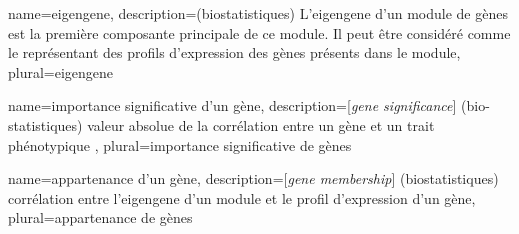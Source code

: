 {
	name={eigengene},
	description={(biostatistiques) L'eigengene d'un module de gènes est la première composante principale de ce module. Il peut être considéré comme le représentant des profils d'expression des gènes présents dans le module}, 
	plural={eigengene}
}

{
	name={importance significative d'un g\`ene},
	description={[\textit{gene significance}] (bio-statistiques) valeur absolue de la corrélation entre un gène et un trait phénotypique }, 
	plural={importance significative de g\`enes}
}

{
	name={appartenance d'un g\`ene},
	description={[\textit{gene membership}] (biostatistiques) corrélation entre l'eigengene d'un module et le profil d'expression d'un gène}, 
	plural={appartenance de g\`enes}
}


